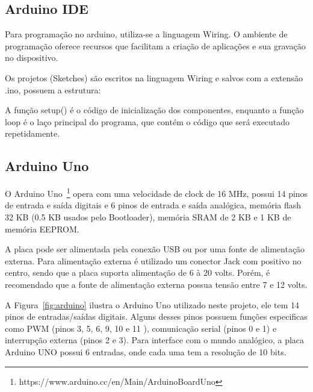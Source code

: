 \subsection{Arduino IDE}

Para programação no arduino, utiliza-se a linguagem Wiring. O ambiente de programação oferece recursos que facilitam a criação de aplicações e sua gravação no dispositivo.

Os projetos (Sketches) são escritos na linguagem Wiring e salvos com a extensão .ino, possuem a estrutura:



A função setup() é o código de inicialização dos componentes, enquanto a função loop é o laço principal do programa, que contém o código que será executado repetidamente.

\subsection{Arduino Uno}

O Arduino Uno~\footnote{https://www.arduino.cc/en/Main/ArduinoBoardUno} opera com uma velocidade de clock de 16 MHz, possui 14 pinos de entrada e saída digitais e 6 pinos de entrada e saída analógica, memória flash 32 KB (0.5 KB usados pelo Bootloader), memória SRAM de 2 KB e 1 KB de memória EEPROM. 

A placa pode ser alimentada pela conexão USB ou por uma fonte de alimentação externa. Para alimentação externa é utilizado um conector Jack com positivo no centro, sendo que a placa suporta alimentação de 6 à 20 volts. Porém, é recomendado que a fonte de alimentação externa possua tensão entre 7 e 12 volts. 

A Figura~\ref{fig:arduino} ilustra o Arduino Uno utilizado neste projeto, ele tem 14 pinos de entradas/saídas digitais. Alguns desses pinos possuem funções especificas como PWM (pinos 3, 5, 6, 9, 10 e 11 ), comunicação serial (pinos 0 e 1) e interrupção externa (pinos 2 e 3).
Para interface com o mundo analógico, a placa Arduino UNO possui 6 entradas, onde cada uma tem a resolução de 10 bits.

